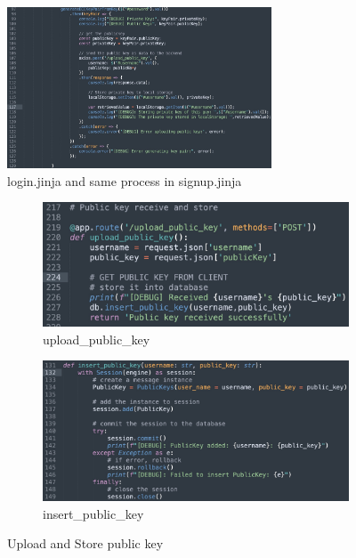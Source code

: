 \documentclass[12pt]{article}
\begin{document}
\begin{enumerate}
            \begin{figure}[H]
                \centering{}
                \includegraphics[width=0.7\textwidth]{graphs/store_key_pairs.jpg}
                \caption{login.jinja and same process in signup.jinja }
                \label{store_key_pairs}
            \end{figure}

            \begin{figure}[H]
                \centering
                \begin{subfigure}[b]{0.45\textwidth}
                    \centering
                    \includegraphics[width=\textwidth]{graphs/upload_public_key.jpg}
                    \caption{upload\_public\_key}
                \end{subfigure}
                \hfill 
                \begin{subfigure}[b]{0.45\textwidth}
                    \centering
                    \includegraphics[width=\textwidth]{graphs/insert_public_key.jpg}
                    \caption{insert\_public\_key}
                \end{subfigure}
                \caption{Upload and Store public key}
                \label{Upload and Store public key}
            \end{figure}


\end{enumerate}
\end{document}
